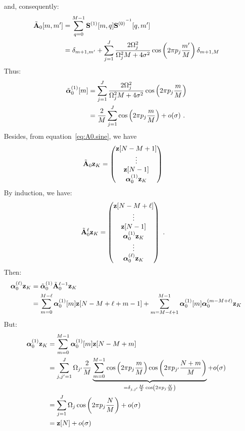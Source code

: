 \documentclass[journal, onecolumn]{IEEEtran}
\begin{document}
and, consequently:
\begin{align}
\nonumber
\tilde\bA_0[m,m']  &= \sum_{q=0}^{M-1} {\bS^{(1)}}[m,q]{\bS^{(0)}}^\inv[q,m'] \\
&= \delta_{m+1,m'} + \sum_{j=1}^J\dfrac{2\Omega_j^2}{\Omega_j^2M+4\sigma^2}\cos\left(2\pi p_j\frac{m'}{M}\right)\delta_{m+1,M}
\label{eq:A0.sine}
\end{align}
Thus:
\begin{align*}
\tilde{\boldsymbol{\alpha}}_0^{(1)}[m]  &=\sum_{j=1}^J\dfrac{2\Omega_j^2}{\Omega_j^2M+4\sigma^2}\cos\left(2\pi p_j\frac{m}{M}\right) \\
&= \dfrac{2}{M}\sum_{j=1}^J\cos\left(2\pi p_j\frac{m}{M}\right) + o(\sigma)\ .
\end{align*}
Besides, from equation~\eqref{eq:A0.sine}, we have
\begin{align*}
\tilde{{\mathbf A}}_0{\mathbf z}_{K} &= 
\begin{pmatrix}
{\mathbf z}[N-M+1] \\
\vdots \\
{\mathbf z}[N-1] \\
\boldsymbol{\alpha}_0^{(1)}{\mathbf z}_K
\end{pmatrix}
\end{align*}
By induction, we have:
\begin{align*}
\tilde{{\mathbf A}}_0^{\ell}{\mathbf z}_{K} &= 
\begin{pmatrix}
{\mathbf z}[N-M+\ell] \\
\vdots \\
{\mathbf z}[N-1] \\
\boldsymbol{\alpha}_0^{(1)}{\mathbf z}_K \\
\vdots \\
\boldsymbol{\alpha}_0^{(\ell)}{\mathbf z}_K
\end{pmatrix}
\ .
\end{align*}
Then:
\begin{align}
\nonumber
\balpha_0^{(\ell)}\bz_{K} &= \tilde\balpha_0^{(1)}\tilde\bA_0^{\ell-1}\bz_{K} \\
&=\sum_{m=0}^{M-\ell}\balpha_0^{(1)}[m]\bz[N-M+\ell+m-1]+\sum_{m=M-\ell+1}^{M-1}\balpha_0^{(1)}[m]\balpha_0^{(m-M+\ell)}\bz_K
\label{eq:seq}
\end{align}
But:
\begin{align*}
\boldsymbol{\alpha}_0^{(1)}{\mathbf z}_{K} &=\sum_{m=0}^{M-1}\boldsymbol{\alpha}_0^{(1)}[m]{\mathbf z}[N-M+m] \\
&=\sum_{j,j'=1}^J\Omega_{j'}\dfrac{2}{M}\underbrace{\sum_{m=0}^{M-1}\cos\left(2\pi p_j\frac{m}{M}\right)\cos\left(2\pi p_{j'}\dfrac{N+m}{M}\right)}_{=\delta_{j,j'}\frac{M}2\cos\left(2\pi p_j\frac{N}M\right)} + o(\sigma) \\
&= \sum_{j=1}^J\Omega_j\cos\left(2\pi p_j\dfrac{N}{M}\right) + o(\sigma) \\
&= {\mathbf z}[N] + o(\sigma)
\end{align*}
\end{document}
